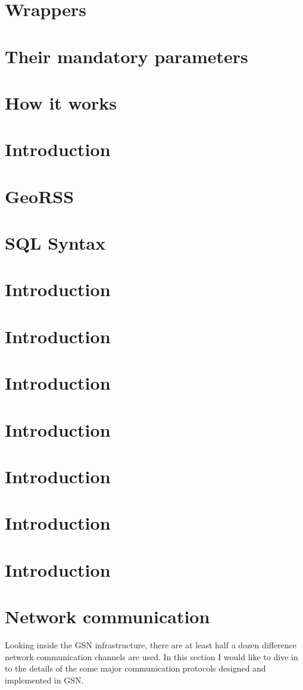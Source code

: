 \section{Wrappers}
\section{Their mandatory parameters}
\section{How it works}
\section{Introduction}
\section{GeoRSS}
\section{SQL Syntax}
\section{Introduction}
\section{Introduction}
\section{Introduction}
\section{Introduction}
\section{Introduction}
\section{Introduction}
\section{Introduction}
\section{Network communication}
Looking inside the GSN infrastructure, there are at least half a dozen difference network communication channels are used. In this section I would like to dive in to the details
of the some major communication protocols designed and implemented in GSN. 

